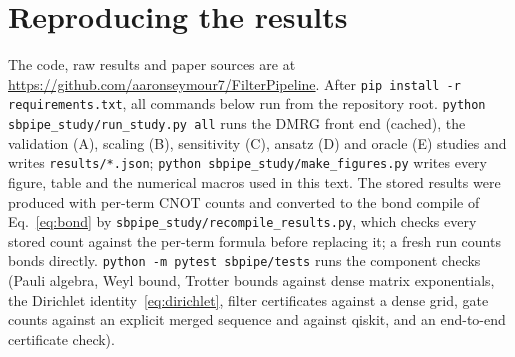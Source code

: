 \documentclass[aps,pra,twocolumn,superscriptaddress,nofootinbib]{revtex4-2}
\begin{document}
\section{Reproducing the results}
\label{app:repro}

The code, raw results and paper sources are at \url{https://github.com/aaronseymour7/FilterPipeline}. After
\texttt{pip install -r requirements.txt}, all commands below run from the repository root.
\texttt{python sbpipe\_study/run\_study.py all} runs the DMRG front end (cached), the validation (A),
scaling (B), sensitivity (C), ansatz (D) and oracle (E) studies and writes \texttt{results/*.json};
\texttt{python sbpipe\_study/make\_figures.py} writes every figure, table and the numerical macros used
in this text. The stored results were produced with per-term CNOT counts and converted to the bond compile of
Eq.~\eqref{eq:bond} by \texttt{sbpipe\_study/recompile\_results.py}, which checks every stored count against the
per-term formula before replacing it; a fresh run counts bonds directly. \texttt{python -m pytest sbpipe/tests} runs the component checks (Pauli algebra, Weyl
bound, Trotter bounds against dense matrix exponentials, the Dirichlet identity~\eqref{eq:dirichlet},
filter certificates against a dense grid, gate counts against an explicit merged sequence and against
qiskit, and an end-to-end certificate check).
\end{document}
